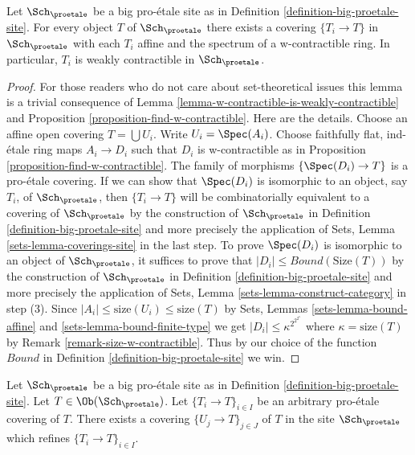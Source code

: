 \begin{lemma}
\label{lemma-get-many-weakly-contractible}
Let $\Sch_\proetale$ be a big pro-\'etale site as in
Definition \ref{definition-big-proetale-site}.
For every object $T$ of $\Sch_\proetale$ there exists
a covering $\{T_i \to T\}$ in $\Sch_\proetale$
with each $T_i$ affine and the spectrum of a w-contractible
ring. In particular, $T_i$ is weakly contractible in $\Sch_\proetale$.
\end{lemma}

\begin{proof}
For those readers who do not care about set-theoretical issues
this lemma is a trivial consequence of
Lemma \ref{lemma-w-contractible-is-weakly-contractible} and
Proposition \ref{proposition-find-w-contractible}.
Here are the details.
Choose an affine open covering $T = \bigcup U_i$. Write $U_i = \Spec(A_i)$.
Choose faithfully flat, ind-\'etale ring maps $A_i \to D_i$
such that $D_i$ is w-contractible as in
Proposition \ref{proposition-find-w-contractible}.
The family of morphisms $\{\Spec(D_i) \to T\}$ is a
pro-\'etale covering.
If we can show that $\Spec(D_i)$ is isomorphic to an object, say $T_i$,
of $\Sch_\proetale$, then $\{T_i \to T\}$ will be combinatorially
equivalent to a covering of $\Sch_\proetale$ by the construction
of $\Sch_\proetale$ in Definition \ref{definition-big-proetale-site}
and more precisely the application of
Sets, Lemma \ref{sets-lemma-coverings-site} in the last step.
To prove $\Spec(D_i)$ is isomorphic to an object of
$\Sch_\proetale$, it suffices to prove that
$|D_i| \leq Bound(\text{Size}(T))$ by the construction
of $\Sch_\proetale$ in Definition \ref{definition-big-proetale-site}
and more precisely the application of
Sets, Lemma \ref{sets-lemma-construct-category} in step (3).
Since $|A_i| \leq \text{size}(U_i) \leq \text{size}(T)$
by Sets, Lemmas \ref{sets-lemma-bound-affine} and
\ref{sets-lemma-bound-finite-type} we get
$|D_i| \leq \kappa^{2^{2^{2^\kappa}}}$ where $\kappa = \text{size}(T)$
by Remark \ref{remark-size-w-contractible}.
Thus by our choice of the function $Bound$ in
Definition \ref{definition-big-proetale-site} we win.
\end{proof}

\begin{lemma}
\label{lemma-proetale-induced}
Let $\Sch_\proetale$ be a big pro-\'etale site as in
Definition \ref{definition-big-proetale-site}.
Let $T \in \Ob(\Sch_\proetale)$.
Let $\{T_i \to T\}_{i \in I}$ be an arbitrary pro-\'etale covering of $T$.
There exists a covering $\{U_j \to T\}_{j \in J}$ of $T$ in the site
$\Sch_\proetale$ which refines $\{T_i \to T\}_{i \in I}$.
\end{lemma}

